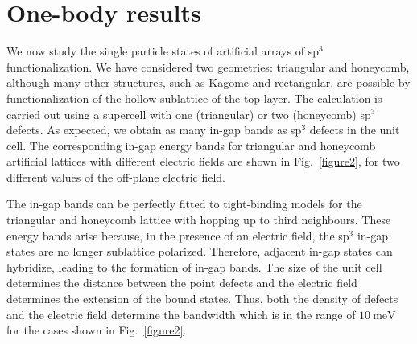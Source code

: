 \section{One-body results}
We now study the single particle states of artificial arrays of sp$^3$ functionalization. We have considered two geometries: triangular and honeycomb, although many other structures, such as Kagome and rectangular, are possible by functionalization of the hollow sublattice of the top layer. The calculation is carried out using a supercell
with one (triangular) or two (honeycomb) sp$^3$ defects. As expected, we obtain as many in-gap bands as sp$^3$ defects in the unit cell. The corresponding in-gap energy bands for triangular and honeycomb artificial lattices with different electric fields are shown in Fig.~\ref{figure2}, for two different values of the off-plane electric field.

The in-gap bands can be perfectly fitted to tight-binding models for the triangular and honeycomb lattice with hopping up to third neighbours. These energy bands arise because, in the presence of an electric field, the sp$^3$ in-gap states are no longer sublattice polarized. Therefore, adjacent in-gap states can hybridize, leading to the formation of in-gap bands. 
The size of the unit cell determines the distance between the point defects and the electric field determines the extension of the bound states.
Thus, both the density of defects and the electric field determine the bandwidth which is in the range of $\SI{10}{\meV}$ for the cases shown in Fig.~\ref{figure2}.
 
